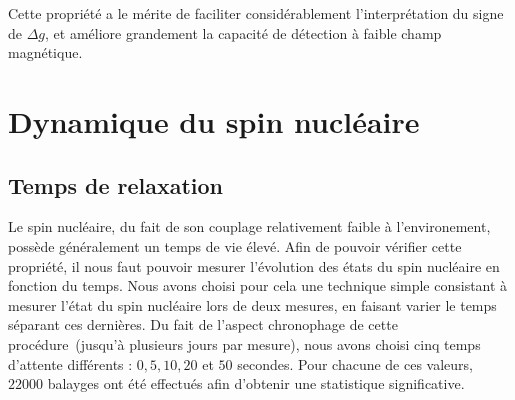 Cette propriété a le mérite de faciliter considérablement l'interprétation du signe de $\Delta g$, et améliore grandement la capacité de détection à faible champ magnétique.

\section{Dynamique du spin nucléaire}


\subsection{Temps de relaxation}
Le spin nucléaire, du fait de son couplage relativement faible à l'environement, possède généralement un temps de vie élevé. Afin de pouvoir vérifier cette propriété, il nous faut pouvoir mesurer l'évolution des états du spin nucléaire en fonction du temps. Nous avons choisi pour cela une technique simple consistant à mesurer l'état du spin nucléaire lors de deux mesures, en faisant varier le temps séparant ces dernières. Du fait de l'aspect chronophage de cette procédure~(jusqu'à plusieurs jours par mesure), nous avons choisi cinq temps d'attente différents : $0,5,10,20$ et $50$ secondes. Pour chacune de ces valeurs, $22000$ balayges ont été effectués afin d'obtenir une statistique significative.


